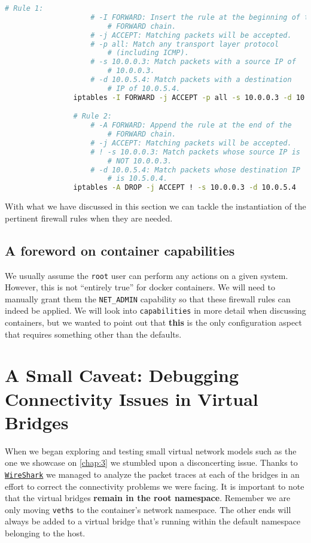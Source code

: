             \begin{lstlisting}[language = bash, caption = Instantiating \texttt{iptables} rules., label = lst:iptables-rules]
                # Rule 1:
                    # -I FORWARD: Insert the rule at the beginning of the
                        # FORWARD chain.
                    # -j ACCEPT: Matching packets will be accepted.
                    # -p all: Match any transport layer protocol
                        # (including ICMP).
                    # -s 10.0.0.3: Match packets with a source IP of
                        # 10.0.0.3.
                    # -d 10.0.5.4: Match packets with a destination
                        # IP of 10.0.5.4.
                iptables -I FORWARD -j ACCEPT -p all -s 10.0.0.3 -d 10.0.5.4

                # Rule 2:
                    # -A FORWARD: Append the rule at the end of the
                        # FORWARD chain.
                    # -j ACCEPT: Matching packets will be accepted.
                    # ! -s 10.0.0.3: Match packets whose source IP is
                        # NOT 10.0.0.3.
                    # -d 10.0.5.4: Match packets whose destination IP
                        # is 10.5.0.4.
                iptables -A DROP -j ACCEPT ! -s 10.0.0.3 -d 10.0.5.4
            \end{lstlisting}

            With what we have discussed in this section we can tackle the instantiation of the pertinent firewall rules when they are needed.

        \subsection{A foreword on container capabilities}
            We usually assume the \texttt{root} user can perform any actions on a given system. However, this is not ``entirely true'' for docker containers. We will need to manually grant them the \texttt{NET\_ADMIN} capability so that these firewall rules can indeed be applied. We will look into \texttt{capabilities} in more detail when discussing containers, but we wanted to point out that \textbf{this} is the only configuration aspect that requires something other than the defaults.

    \section{A Small Caveat: Debugging Connectivity Issues in Virtual Bridges}
        When we began exploring and testing small virtual network models such as the one we showcase on \ref{chap:3} we stumbled upon a disconcerting issue. Thanks to \href{https://www.wireshark.org}{\texttt{WireShark}} we managed to analyze the packet traces at each of the bridges in an effort to correct the connectivity problems we were facing. It is important to note that the virtual bridges \textbf{remain in the root namespace}. Remember we are only moving \texttt{veths} to the container's network namespace. The other ends will always be added to a virtual bridge that's running within the default namespace belonging to the host.

